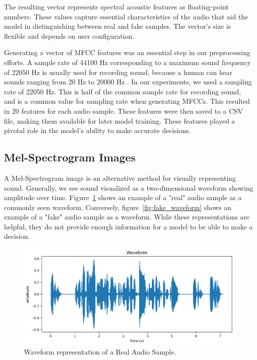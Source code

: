 \documentclass[sigconf,authordraft]{acmart}
\begin{document}
The resulting vector represents spectral acoustic features as floating-point numbers. These values capture essential characteristics of the audio that aid the model in distinguishing between real and fake samples. The vector's size is flexible and depends on user configuration. 

Generating a vector of MFCC features was an essential step in our preprocessing efforts. A sample rate of 44100 Hz corresponding to a maximum sound frequency of 22050 Hz is usually used for recording sound, because a human can hear sounds ranging from 20 Hz to 20000 Hz \cite{9252126}. In our experiments, we used a sampling rate of 22050 Hz. This is half of the common sample rate for recording sound, and is a common value for sampling rate when generating MFCCs. This resulted in 20 features for each audio sample. These features were then saved to a CSV file, making them available for later model training. These features played a pivotal role in the model's ability to make accurate decisions.

\subsection{Mel-Spectrogram Images}
A Mel-Spectrogram image is an alternative method for visually representing sound. Generally, we see sound visualized as a two-dimensional waveform showing amplitude over time. Figure~\ref{fig:real_waveform} shows an example of a "real" audio sample as a commonly seen waveform. Conversely, figure~\ref{fig:fake_waveform} shows an example of a "fake" audio sample as a waveform. While these representations are helpful, they do not provide enough information for a model to be able to make a decision. 

\begin{figure}
  \centering
  \includegraphics[width=\linewidth]{images/real_waveform.png}
  \caption{Waveform representation of a Real Audio Sample.}
  \label{fig:real_waveform}
\end{figure}
\end{document}
